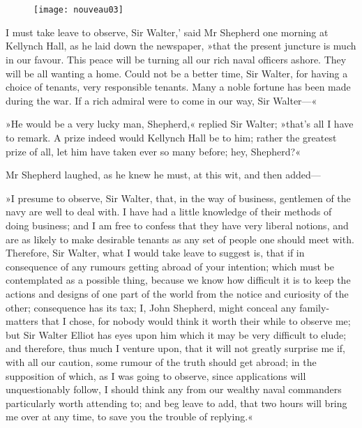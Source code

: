 \chapter[Chapter \thechapter]{}

\begin{figure}[t!]
\centering
\texttt{[image: nouveau03]}
\end{figure}

\lettrine[lines=4,lraise=0.3,ante=`]{I}{} must take leave to observe, Sir Walter,' said Mr Shepherd one morning at Kellynch Hall, as he laid down the newspaper, »that the present juncture is much in our favour. This peace will be turning all our rich naval officers ashore. They will be all wanting a home. Could not be a better time, Sir Walter, for having a choice of tenants, very responsible tenants. Many a noble fortune has been made during the war. If a rich admiral were to come in our way, Sir Walter—«

»He would be a very lucky man, Shepherd,« replied Sir Walter; »that's all I have to remark. A prize indeed would Kellynch Hall be to him; rather the greatest prize of all, let him have taken ever so many before; hey, Shepherd?«

Mr Shepherd laughed, as he knew he must, at this wit, and then added—

»I presume to observe, Sir Walter, that, in the way of business, gentlemen of the navy are well to deal with. I have had a little knowledge of their methods of doing business; and I am free to confess that they have very liberal notions, and are as likely to make desirable tenants as any set of people one should meet with. Therefore, Sir Walter, what I would take leave to suggest is, that if in consequence of any rumours getting abroad of your intention; which must be contemplated as a possible thing, because we know how difficult it is to keep the actions and designs of one part of the world from the notice and curiosity of the other; consequence has its tax; I, John Shepherd, might conceal any family-matters that I chose, for nobody would think it worth their while to observe me; but Sir Walter Elliot has eyes upon him which it may be very difficult to elude; and therefore, thus much I venture upon, that it will not greatly surprise me if, with all our caution, some rumour of the truth should get abroad; in the supposition of which, as I was going to observe, since applications will unquestionably follow, I should think any from our wealthy naval commanders particularly worth attending to; and beg leave to add, that two hours will bring me over at any time, to save you the trouble of replying.«

